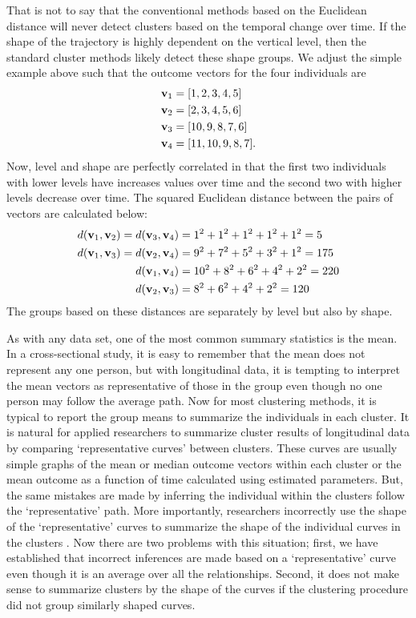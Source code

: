 That is not to say that the conventional methods based on the Euclidean distance will never detect clusters based on the temporal change over time. If the shape of the trajectory is highly dependent on the vertical level, then the standard cluster methods likely detect these shape groups. We adjust the simple example above such that the outcome vectors for the four individuals are
\begin{align*}
\mathbf v_{1}&=[1,2,3,4,5]\\
\mathbf v_{2}&=[2,3,4,5,6]\\
\mathbf v_{3}&=[10,9,8,7,6]\\
\mathbf v_{4}&=[11,10,9,8,7].
\end{align*}
Now, level and shape are perfectly correlated in that the first two individuals with lower levels have increases values over time and the second two with higher levels decrease over time. The squared Euclidean distance between the pairs of vectors are calculated below:
\begin{align*}
d(\mathbf v_{1},\mathbf v_{2}) = d(\mathbf v_{3},\mathbf v_{4}) &= 1^{2}+1^{2}+1^{2}+1^{2} + 1^{2} = 5\\
d(\mathbf v_{1},\mathbf v_{3}) = d(\mathbf v_{2},\mathbf v_{4}) &= 9^{2}+7^{2}+5^{2}+3^{2}+1^{2}=175\\
d(\mathbf v_{1},\mathbf v_{4}) &= 10^{2}+8^{2}+6^{2}+4^{2}+2^{2}=220\\
d(\mathbf v_{2},\mathbf v_{3}) &= 8^{2}+6^{2}+4^{2}+2^{2}=120
\end{align*}
The groups based on these distances are separately by level but also by shape. 

As with any data set, one of the most common summary statistics is the mean. In a cross-sectional study, it is easy to remember that the mean does not represent any one person, but with longitudinal data, it is tempting to interpret the mean vectors as representative of those in the group even though no one person may follow the average path. Now for most clustering methods, it is typical to report the group means to summarize the individuals in each cluster. It is natural for applied researchers to summarize cluster results of longitudinal data by comparing `representative curves' between clusters. These curves are usually simple graphs of the mean or median outcome vectors within each cluster or the mean outcome as a function of time calculated using estimated parameters. But, the same mistakes are made by inferring the individual within the clusters follow the `representative' path. More importantly, researchers incorrectly use the shape of the `representative' curves to summarize the shape of the individual curves in the clusters \cite{windle2004,mulvaney2006,broadbent2008,pryor2011,mccoy2010}. Now there are two problems with this situation; first, we have established that incorrect inferences are made based on a `representative' curve  even though it is an average over all the relationships. Second, it does not make sense to summarize clusters by the shape of the curves if the clustering procedure did not group similarly shaped curves. 


